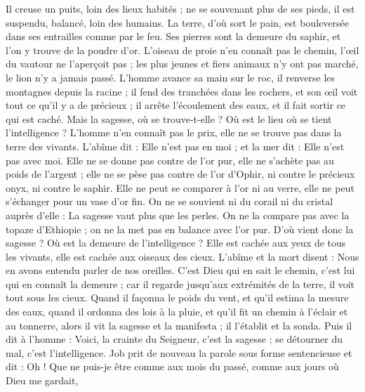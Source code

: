 \begin{multicols}{2}
Il creuse un puits, loin des lieux habités ; ne se souvenant plus de ses pieds, il est suspendu, balancé, loin des humains.
La terre, d'où sort le pain, est bouleversée dans ses entrailles comme par le feu.
Ses pierres sont la demeure du saphir, et l'on y trouve de la poudre d'or.
L'oiseau de proie n'en connaît pas le chemin, l'œil du vautour ne l'aperçoit pas ;
les plus jeunes et fiers animaux n'y ont pas marché, le lion n'y a jamais passé.
L'homme avance sa main sur le roc, il renverse les montagnes depuis la racine ;
il fend des tranchées dans les rochers, et son œil voit tout ce qu'il y a de précieux ;
il arrête l'écoulement des eaux, et il fait sortir ce qui est caché.
Mais la sagesse, où se trouve-t-elle ? Où est le lieu où se tient l'intelligence ?
L'homme n'en connaît pas le prix, elle ne se trouve pas dans la terre des vivants.
L'abîme dit : Elle n'est pas en moi ; et la mer dit : Elle n'est pas avec moi.
Elle ne se donne pas contre de l'or pur, elle ne s'achète pas au poids de l'argent ;
elle ne se pèse pas contre de l'or d'Ophir, ni contre le précieux onyx, ni contre le saphir.
Elle ne peut se comparer à l'or ni au verre, elle ne peut s'échanger pour un vase d'or fin.
On ne se souvient ni du corail ni du cristal auprès d'elle : La sagesse vaut plus que les perles.
On ne la compare pas avec la topaze d'Ethiopie ; on ne la met pas en balance avec l'or pur.
D'où vient donc la sagesse ? Où est la demeure de l'intelligence ?
Elle est cachée aux yeux de tous les vivants, elle est cachée aux oiseaux des cieux.
L'abîme et la mort disent : Nous en avons entendu parler de nos oreilles.
C'est Dieu qui en sait le chemin, c'est lui qui en connaît la demeure ;
car il regarde jusqu'aux extrémités de la terre, il voit tout sous les cieux.
Quand il façonna le poids du vent, et qu'il estima la mesure des eaux,
quand il ordonna des lois à la pluie, et qu'il fit un chemin à l'éclair et au tonnerre,
alors il vit la sagesse et la manifesta ; il l'établit et la sonda.
Puis il dit à l'homme : Voici, la crainte du Seigneur, c'est la sagesse ; se détourner du mal, c'est l'intelligence.
\VerseOne{}Job prit de nouveau la parole sous forme sentencieuse et dit :
Oh ! Que ne puis-je être comme aux mois du passé, comme aux jours où Dieu me gardait,

\end{multicols}
